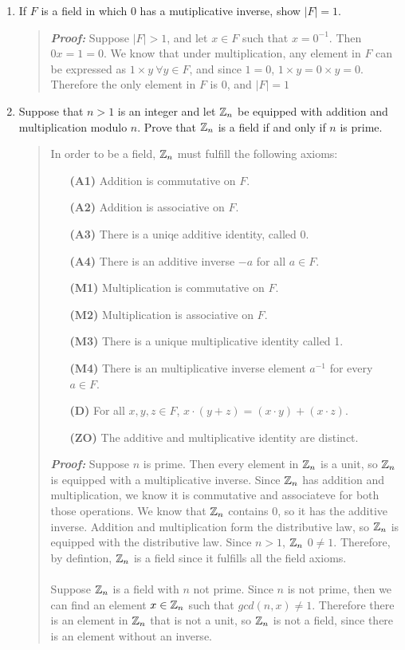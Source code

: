 \documentclass{hw}
\begin{document}
\begin{enumerate}
\item If $F$ is a field in which 0 has a mutiplicative inverse, show $|F|=1$.
\begin{quote}
\textbf{\textit{Proof:}} Suppose $|F|>1$, and let $x\in F$ such that $x=0^{-1}$. Then $0x=1=0$. We know that under multiplication, any element in $F$ can be expressed as $1\times y\ \forall y\in F$, and since $1=0$, $1\times y = 0 \times y = 0$. Therefore the only element in $F$ is 0, and $|F|=1$
\end{quote}

\item Suppose that $n>1$ is an integer and let $\mathbb{Z}_{n}$ be equipped with addition and multiplication modulo $n$. Prove that $\mathbb{Z}_{n}$ is a field if and only if $n$ is prime.
\begin{quote}
In order to be a field, $\mathbb{Z}_{n}$ must fulfill the following axioms:
\begin{enumerate}
\item[\textbf{(A1)}] Addition is commutative on $F$.
\item[\textbf{(A2)}] Addition is associative on $F$.
\item[\textbf{(A3)}] There is a uniqe additive identity, called 0.
\item[\textbf{(A4)}] There is an additive inverse $-a$ for all $a\in F$.
\item[\textbf{(M1)}] Multiplication is commutative on $F$.
\item[\textbf{(M2)}] Multiplication is associative on $F$.
\item[\textbf{(M3)}] There is a unique multiplicative identity called 1.
\item[\textbf{(M4)}] There is an multiplicative inverse element $a^{-1}$ for every $a\in F$.
\item[\textbf{(D)}] For all $x,y,z\in F$, $x\cdot(y+z)=(x\cdot y)+(x\cdot z)$.
\item[\textbf{(ZO)}] The additive and multiplicative identity are distinct.
\end{enumerate}

\textbf{\textit{Proof:}} Suppose $n$ is prime. Then every element in $\mathbb{Z}_{n}$ is a unit, so $\mathbb{Z}_{n}$ is equipped with a multiplicative inverse. Since $\mathbb{Z}_{n}$ has addition and multiplication, we know it is commutative and associateve for both those operations. We know that $\mathbb{Z}_{n}$ contains 0, so it has the additive inverse. Addition and multiplication form the distributive law, so $\mathbb{Z}_{n}$ is equipped with the distributive law. Since $n>1$, $\mathbb{Z}_{n}$ $0\neq1$. Therefore, by defintion, $\mathbb{Z}_{n}$ is a field since it fulfills all the field axioms.\\\\
Suppose $\mathbb{Z}_{n}$ is a field with $n$ not prime. Since $n$ is not prime, then we can find an element $x\in\mathbb{Z}_{n}$ such that $gcd(n,x)\neq1$. Therefore there is an element in $\mathbb{Z}_{n}$ that is not a unit, so $\mathbb{Z}_{n}$ is not a field, since there is an element without an inverse.
\end{quote}


\end{enumerate}
\end{document}
